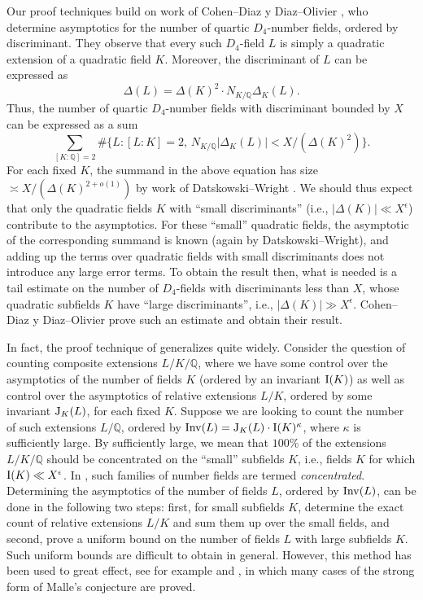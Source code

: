 \documentclass[10pt]{article}
\theoremstyle{plain}
\theoremstyle{definition}
\theoremstyle{remark}
\def\Q{{\mathbb Q}}
\def\Q{{\mathbb Q}}
\begin{document}
Our proof techniques build on work of Cohen--Diaz y Diaz--Olivier \cite{MR1918290}, who
determine asymptotics for the number of quartic $D_4$-number fields,
ordered by discriminant. They observe that every such $D_4$-field $L$
is simply a quadratic extension of a quadratic field $K$. Moreover,
the discriminant of $L$ can be expressed as
\begin{equation*}
\Delta(L)=\Delta(K)^2\cdot N_{K/\Q}\Delta_K(L).
\end{equation*}
Thus, the number of quartic $D_4$-number fields with discriminant
bounded by $X$ can be expressed as a sum
\begin{equation*}
\sum_{[K:\Q]=2} \#\bigl\{L:[L:K]=2,\,N_{K/\Q}|\Delta_K(L)|<X/(\Delta(K)^2)\bigr\}.
\end{equation*}
For each fixed $K$, the summand in the above equation has
size $\asymp X/(\Delta(K)^{2+o(1)})$ by work of Datskowski--Wright
\cite{MR936994}. We should thus expect that only the quadratic fields $K$ with
``small discriminants'' (i.e., $|\Delta(K)|\ll X^\epsilon$) contribute to
the asymptotics. For these ``small'' quadratic fields, the asymptotic
of the corresponding summand is known (again by
Datskowski--Wright), and adding up the terms over quadratic fields with small discriminants does not introduce any large error terms. To obtain the result then, what is needed is a tail estimate on the number of $D_4$-fields with discriminants less than $X$, whose quadratic subfields $K$ have ``large discriminants'', i.e., $|\Delta(K)|\gg X^\epsilon$. Cohen--Diaz y Diaz--Olivier prove such an estimate and obtain their result.

In fact, the proof technique of \cite{MR1918290} generalizes quite widely.
Consider the question of counting composite extensions $L/K/\Q$, where
we have some control over the asymptotics of the number of fields $K$
(ordered by an invariant ${\rm I}(K)$) as well as control over the asymptotics of
relative extensions $L/K$, ordered by some invariant ${\rm J}_K(L)$, for
each fixed $K$. Suppose we are looking to count the number of such
extensions $L/\Q$, ordered by ${\rm Inv}(L)={\rm J}_K(L)\cdot {\rm I}(K)^\kappa$, where
$\kappa$ is sufficiently large. By sufficiently large, we mean that
$100\%$ of the extensions $L/K/\Q$ should be concentrated on the
``small'' subfields $K$, i.e., fields $K$ for which ${\rm I}(K)\ll
X^\epsilon$. In \cite{ALWWPreprint}, such families of number fields are termed {\it concentrated}. Determining the asymptotics of the number of fields $L$,
ordered by ${\rm Inv}(L)$, can be done in the following two steps: first,
for small subfields $K$, determine the exact count of
relative extensions $L/K$ and sum them up over the small fields, and second, prove a uniform bound on the number of fields $L$ with large subfields
$K$. Such uniform bounds are difficult to obtain in general. However, this
method has been used to great effect, see for example
\cite{MR2904935,MR4047213} and \cite{ALWWPreprint}, in which many cases of the strong form of Malle's conjecture are proved.
\end{document}
